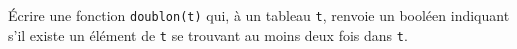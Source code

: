 \exer{}
\setcounter{numques}{0}

\question \'Ecrire une fonction \texttt{doublon(t)} qui, à un tableau \texttt{t}, renvoie un booléen indiquant s'il existe un élément de \texttt{t} se trouvant au moins deux fois dans \texttt{t}.